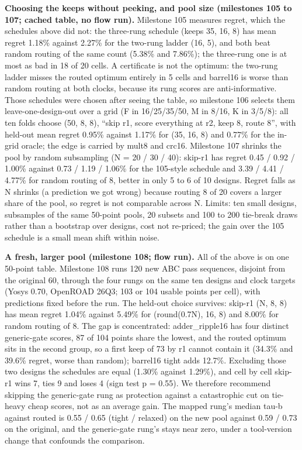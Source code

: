 \documentclass[conference]{IEEEtran}
\begin{document}
\textbf{Choosing the keeps without peeking, and pool size (milestones
105 to 107; cached table, no flow run).} Milestone 105 measures regret,
which the schedules above did not: the three-rung schedule (keeps 35,
16, 8) has mean regret 1.18\% against 2.27\% for the two-rung ladder
(16, 5), and both beat random routing of the same count (5.38\% and
7.86\%); the three-rung one is at most as bad in 18 of 20 cells. A
certificate is not the optimum: the two-rung ladder misses the routed
optimum entirely in 5 cells and barrel16 is worse than random routing at
both clocks, because its rung scores are anti-informative. Those
schedules were chosen after seeing the table, so milestone 106 selects
them leave-one-design-out over a grid (F in 16/25/35/50, M in 8/16, K in
3/5/8): all ten folds choose (50, 8, 8), ``skip r1, score everything at
r2, keep 8, route 8'', with held-out mean regret 0.95\% against 1.17\%
for (35, 16, 8) and 0.77\% for the in-grid oracle; the edge is carried
by mult8 and crc16. Milestone 107 shrinks the pool by random subsampling
(N = 20 / 30 / 40): skip-r1 has regret 0.45 / 0.92 / 1.00\% against 0.73
/ 1.19 / 1.06\% for the 105-style schedule and 3.39 / 4.41 / 4.77\% for
random routing of 8, better in only 5 to 6 of 10 designs. Regret falls
as N shrinks (a prediction we got wrong) because routing 8 of 20 covers
a larger share of the pool, so regret is not comparable across N.
Limits: ten small designs, subsamples of the same 50-point pools, 20
subsets and 100 to 200 tie-break draws rather than a bootstrap over
designs, cost not re-priced; the gain over the 105 schedule is a small
mean shift within noise.

\textbf{A fresh, larger pool (milestone 108; flow run).} All of the
above is on one 50-point table. Milestone 108 runs 120 new ABC pass
sequences, disjoint from the original 60, through the four rungs on the
same ten designs and clock targets (Yosys 0.70, OpenROAD 26Q3; 103 or
104 usable points per cell), with predictions fixed before the run. The
held-out choice survives: skip-r1 (N, 8, 8) has mean regret 1.04\%
against 5.49\% for (round(0.7N), 16, 8) and 8.00\% for random routing of
8. The gap is concentrated: adder\_ripple16 has four distinct
generic-gate scores, 87 of 104 points share the lowest, and the routed
optimum sits in the second group, so a first keep of 73 by r1 cannot
contain it (34.3\% and 39.6\% regret, worse than random); barrel16 tight
adds 12.7\%. Excluding those two designs the schedules are equal (1.30\%
against 1.29\%), and cell by cell skip-r1 wins 7, ties 9 and loses 4
(sign test p = 0.55). We therefore recommend skipping the generic-gate
rung as protection against a catastrophic cut on tie-heavy cheap scores,
not as an average gain. The mapped rung's median tau-b against routed is
0.55 / 0.65 (tight / relaxed) on the new pool against 0.59 / 0.73 on the
original, and the generic-gate rung's stays near zero, under a
tool-version change that confounds the comparison.
\end{document}
